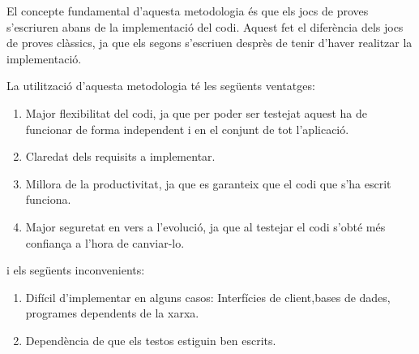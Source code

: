 El concepte fundamental d'aquesta metodologia és que els jocs de proves s'escriuren abans de la implementació del codi. Aquest fet el diferència dels jocs de proves clàssics, ja que els segons s'escriuen desprès de tenir d'haver realitzar la implementació.

La utilització d'aquesta metodologia té les següents ventatges: 

\begin{enumerate}
    \item{Major flexibilitat del codi, ja que per poder ser testejat aquest ha de funcionar de forma independent i en el conjunt de tot l'aplicació.}
    \item{Claredat dels requisits a implementar.}
    \item{Millora de la productivitat, ja que es garanteix que el codi que s'ha escrit funciona.}
    \item{Major seguretat en vers a l'evolució, ja que al testejar el codi s'obté més confiança a l'hora de canviar-lo.}
\end{enumerate}

i els següents inconvenients: 

\begin{enumerate}
    \item{Difícil d'implementar en alguns casos: Interfícies de client,bases de dades, programes dependents de la xarxa.}
    \item{Dependència de que els testos estiguin ben escrits. }
\end{enumerate}

